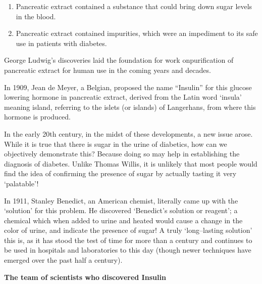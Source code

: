 \vspace{-\topsep}
\begin{enumerate}
\itemsep=0pt
\item Pancreatic extract contained a substance that could bring down sugar levels in the blood.
\item Pancreatic extract contained impurities, which were an impediment to its safe use in patients with diabetes.
\end{enumerate}
\vspace{-\topsep}

George Ludwig’s discoveries laid the foundation for work on\break purification of pancreatic extract for human use in the coming years and decades.

In 1909, Jean de Meyer, a Belgian, proposed the name “Insulin” for this glucose lowering hormone in pancreatic extract, derived from the Latin word ‘insula’ meaning island, referring to the islets (or islands) of Langerhans, from where this hormone is produced.

In the early 20th century, in the midst of these developments, a new issue arose. While it is true that there is sugar in the urine of diabetics, how can we objectively demonstrate this? Because doing so may help in establishing the diagnosis of diabetes. Unlike Thomas Willis, it is unlikely that most people would find the idea of confirming the presence of sugar by actually tasting it very ‘palatable’!

In 1911, Stanley Benedict, an American chemist, literally came up with the ‘solution’ for this problem. He discovered ‘Benedict’s solution or reagent’; a chemical which when added to urine and heated would cause a change in the color of urine, and indicate the presence of sugar! A truly ‘long–lasting solution’ this is, as it has stood the test of time for more than a century and continues to be used in hospitals and laboratories to this day (though newer techniques have emerged over the past half a century).

\begin{center}
\textbf{The team of scientists who discovered Insulin}
\end{center}


